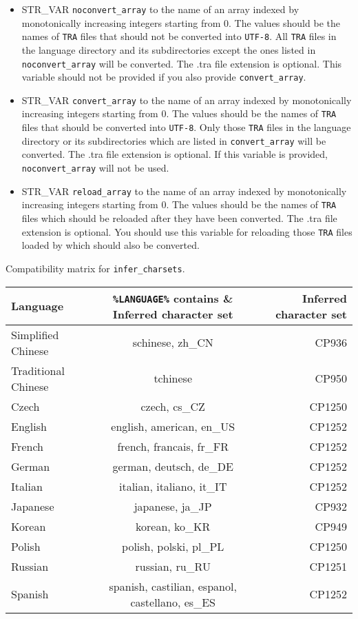 \documentclass{article}
\def\ttref#1{\ahrefloc{#1}{\tt #1}}
\def\t#1{{\tt #1}}
\begin{document}
\begin{itemize}
\item STR_VAR \verb+noconvert_array+ to the name of an array indexed by monotonically increasing integers starting from 0. The values should be the names of \t{TRA} files that should not be converted into \t{UTF-8}. All \t{TRA} files in the language directory and its subdirectories except the ones listed in \verb+noconvert_array+ will be converted. The .tra file extension is optional. This variable should not be provided if you also provide \verb+convert_array+.
\item STR_VAR \verb+convert_array+ to the name of an array indexed by monotonically increasing integers starting from 0. The values should be the names of \t{TRA} files that should be converted into \t{UTF-8}. Only those \t{TRA} files in the language directory or its subdirectories which are listed in \verb+convert_array+ will be converted. The .tra file extension is optional. If this variable is provided, \verb+noconvert_array+ will not be used.
\item STR_VAR \verb+reload_array+ to the name of an array indexed by monotonically increasing integers starting from 0. The values should be the names of \t{TRA} files which should be reloaded after they have been converted. The .tra file extension is optional. You should use this variable for reloading those \t{TRA} files loaded by \ttref{LANGUAGE} which should also be converted.
\end{itemize}

Compatibility matrix for \verb+infer_charsets+.
\begin{tabular} {l c r}
\hline
Language & \verb+%LANGUAGE%+ contains & Inferred character set \\
\hline
Simplified Chinese & schinese, zh_CN & CP936 \\
Traditional Chinese & tchinese & CP950 \\
Czech & czech, cs_CZ & CP1250 \\
English & english, american, en_US & CP1252 \\
French & french, francais, fr_FR & CP1252 \\
German & german, deutsch, de_DE & CP1252 \\
Italian & italian, italiano, it_IT & CP1252 \\
Japanese & japanese, ja_JP & CP932 \\
Korean & korean, ko_KR & CP949 \\
Polish & polish, polski, pl_PL & CP1250 \\
Russian & russian, ru_RU & CP1251 \\
Spanish & spanish, castilian, espanol, castellano, es_ES & CP1252 \\
\hline
\end{tabular}
\\
\end{document}
